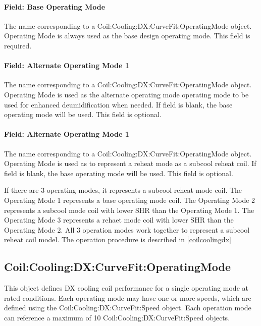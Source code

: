 \paragraph{Field: Base Operating Mode}\label{field-base-operating-mode}

The name corresponding to a Coil:Cooling:DX:CurveFit:OperatingMode object. Operating Mode is always used as the base design operating mode. This field is required.

\paragraph{Field: Alternate Operating Mode 1}\label{field-alternate-operating-mode-1}

The name corresponding to a Coil:Cooling:DX:CurveFit:OperatingMode object. Operating Mode is used as the alternate operating mode operating mode to be used for enhanced deumidification when needed. If field is blank, the base operating mode will be used. This field is optional.

\paragraph{Field: Alternate Operating Mode 1}\label{field-alternate-operating-mode-2}

The name corresponding to a Coil:Cooling:DX:CurveFit:OperatingMode object. Operating Mode is used as to represent a reheat mode as a subcool reheat coil. If field is blank, the base operating mode will be used. This field is optional.

If there are 3 operating modes, it represents a subcool-reheat mode coil. The Operating Mode 1 represents a base operating mode coil. The Operating Mode 2 represents a subcool mode coil with lower SHR than the Operating Mode 1. The Operating Mode 3 represents a rehaet mode coil with lower SHR than the Operating Mode 2. All 3 operation modes work together to represent a subcool reheat coil model. The operation procedure is described in \ref{coilcoolingdx}  

\subsection{Coil:Cooling:DX:CurveFit:OperatingMode}\label{coilcoolingdxcurvefitoperatingmode}

This object defines DX cooling coil performance for a single operating mode at rated conditions. Each operating mode may have one or more speeds, which are defined using the Coil:Cooling:DX:CurveFit:Speed object. Each operation mode can reference a maximum of 10 Coil:Cooling:DX:CurveFit:Speed objects.

